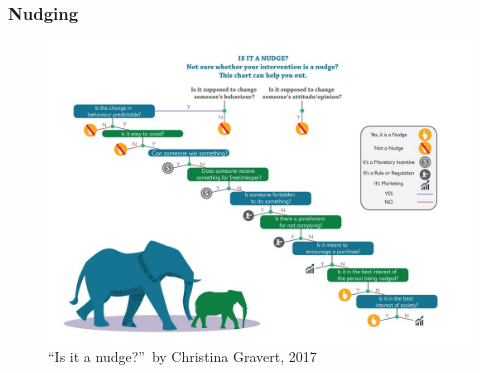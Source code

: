 \documentclass[11pt]{article}
\theoremstyle{definition}
\begin{document}

\subsubsection{Nudging}
\begin{figure}[H]
	\centering
	\includegraphics[width=0.7\linewidth]{img/nudging}
	\caption{\textquotedblleft Is it a nudge?\textquotedblright\ by Christina Gravert, 2017}
	\label{fig:nudging}
\end{figure}
\end{document}
